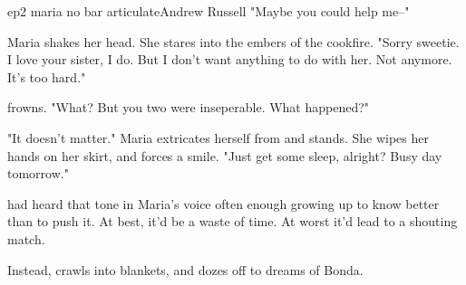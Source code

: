 \documentclass{book}
\begin{document}
\begin{childnode}{ep2 maria no bar articulate}{Andrew Russell}
    "Maybe you could help me--"

    Maria shakes her head. She stares into the embers of the cookfire. "Sorry sweetie. I love your sister, I do. But I don't want anything to do with her. Not anymore. It's too hard."

    \name{} frowns. "What? But you two were inseperable. What happened?"

    "It doesn't matter." Maria extricates herself from \name{} and stands. She wipes her hands on her skirt, and forces a smile. "Just get some sleep, alright? Busy day tomorrow."

    \name{} had heard that tone in Maria's voice often enough growing up to know better than to push it. At best, it'd be a waste of time. At worst it'd lead to a shouting match.

    Instead, \name{} crawls into \hisher{} blankets, and dozes off to dreams of Bonda.


\end{childnode}
\end{document}
